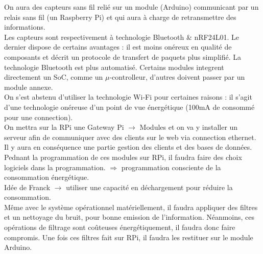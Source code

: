 On aura des capteurs sans fil relié sur un module (Arduino) communicant par un
relais sans fil (un Raspberry Pi) et qui aura à charge de retransmettre des
informations.\\
Les capteurs sont respectivement à technologie Bluetooth \& nRF24L01. Le dernier
dispose de certains avantages : il est moins onéreux en qualité de composants et
décrit un protocole de transfert de paquets plus simplifié. La technologie
Bluetooth est plus automatisé.
Certains modules integrent directement un SoC, comme un $\mu$-controlleur, d'autres
doivent passer par un module annexe.\\
On s'est abstenu d'utiliser la technologie Wi-Fi pour certaines raisons : il s'agit
d'une technologie onéreuse d'un point de vue énergétique (100mA de consommé pour
une connection).\\
On mettra sur la RPi une Gateway Pi $\rightarrow$ Modules et on va y installer un
serveur afin de communiquer avec des clients sur le web via connection ethernet.
Il y aura en conséquence une partie gestion des clients et des bases de données.\\
Pednant la programmation de ces modules sur RPi, il faudra faire des choix
logiciels dans la programmation. $\Rightarrow$ programmation consciente de la
consommation énergétique.\\
Idée de Franck $\rightarrow$ utiliser une capacité en déchargement pour réduire
la consommation.\\
Même avec le système opérationnel matériellement, il faudra appliquer des filtres
et un nettoyage du bruit, pour bonne emission de l'information. Néanmoins, ces
opérations de filtrage sont coûteuses énergétiquement, il faudra donc faire
compromis. Une fois ces filtres fait sur RPi, il faudra les restituer sur le
module Arduino.
